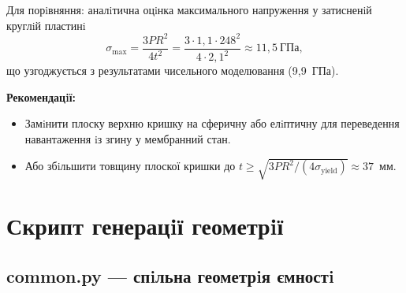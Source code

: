 Для порiвняння: аналiтична оцiнка максимального напруження у затисненiй круглiй пластинi
\[
  \sigma_{\max} = \frac{3 P R^2}{4 t^2}
    = \frac{3 \cdot 1{,}1 \cdot 248^2}{4 \cdot 2{,}1^2}
    \approx 11{,}5~\text{ГПа},
\]
що узгоджується з результатами чисельного моделювання (9{,}9~ГПа).

\textbf{Рекомендацiї:}
\begin{itemize}
  \item Замiнити плоску верхню кришку на сферичну або елiптичну для переведення навантаження iз згину у мембранний стан.
  \item Або збiльшити товщину плоскої кришки до $t \geq \sqrt{3PR^2 / (4\sigma_{\mathrm{yield}})} \approx 37$~мм.
\end{itemize}

\appendix
\section{Скрипт генерацiї геометрiї}

\subsection{common.py --- спiльна геометрiя ємностi}

